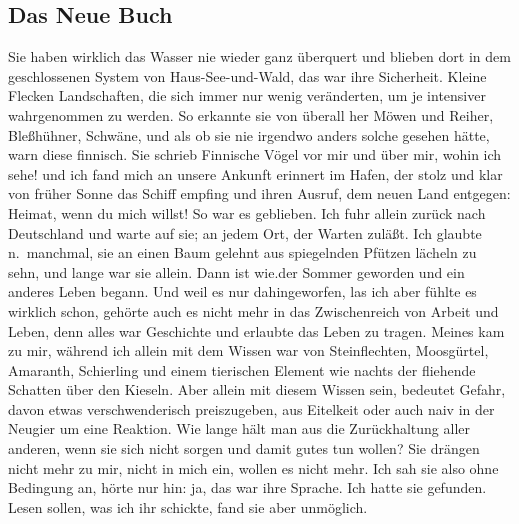 \documentclass[
]{article}
\author{}
\date{\vspace{-2.5em}}
\begin{document}
\subsection{Das Neue Buch}\label{das-neue-buch}

Sie haben wirklich das Wasser nie wieder ganz überquert und blieben dort
in dem geschlossenen System von Haus-See-und-Wald, das war ihre
Sicherheit. Kleine Flecken Landschaften, die sich immer nur wenig
veränderten, um je intensiver wahrgenommen zu werden. So erkannte sie
von überall her Möwen und Reiher, Bleßhühner, Schwäne, und als ob sie
nie irgendwo anders solche gesehen hätte, warn diese finnisch. Sie
schrieb Finnische Vögel vor mir und über mir, wohin ich sehe! und ich
fand mich an unsere Ankunft erinnert im Hafen, der stolz und klar von
früher Sonne das Schiff empfing und ihren Ausruf, dem neuen Land
entgegen: Heimat, wenn du mich willst! So war es geblieben. Ich fuhr
allein zurück nach Deutschland und warte auf sie; an jedem Ort, der
Warten zuläßt. Ich glaubte n.~manchmal, sie an einen Baum gelehnt aus
spiegelnden Pfützen lächeln zu sehn, und lange war sie allein. Dann ist
wie.der Sommer geworden und ein anderes Leben begann. Und weil es nur
dahingeworfen, las ich aber fühlte es wirklich schon, gehörte auch es
nicht mehr in das Zwischenreich von Arbeit und Leben, denn alles war
Geschichte und erlaubte das Leben zu tragen. Meines kam zu mir, während
ich allein mit dem Wissen war von Steinflechten, Moosgürtel, Amaranth,
Schierling und einem tierischen Element wie nachts der fliehende
Schatten über den Kieseln. Aber allein mit diesem Wissen sein, bedeutet
Gefahr, davon etwas verschwenderisch preiszugeben, aus Eitelkeit oder
auch naiv in der Neugier um eine Reaktion. Wie lange hält man aus die
Zurückhaltung aller anderen, wenn sie sich nicht sorgen und damit gutes
tun wollen? Sie drängen nicht mehr zu mir, nicht in mich ein, wollen es
nicht mehr. Ich sah sie also ohne Bedingung an, hörte nur hin: ja, das
war ihre Sprache. Ich hatte sie gefunden. Lesen sollen, was ich ihr
schickte, fand sie aber unmöglich.
\end{document}
